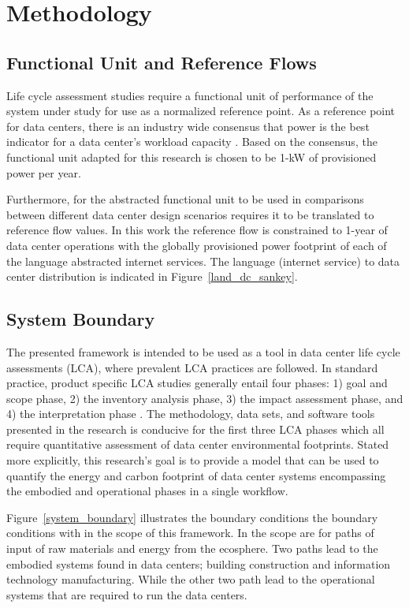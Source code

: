 \section{Methodology}
    \subsection{Functional Unit and Reference Flows}
    Life cycle assessment studies require a functional unit of performance of the system under study for use as a normalized reference point. As a reference point for data centers, there is an industry wide consensus that power is the best indicator for a data center's workload capacity \cite{shah11, whitehead15, barroso18}. Based on the consensus, the functional unit adapted for this research is chosen to be 1-kW of provisioned power per year. 
    
    Furthermore, for the abstracted functional unit to be used in comparisons between different data center design scenarios requires it to be translated to reference flow values. In this work the reference flow is constrained to 1-year of data center operations with the globally provisioned power footprint of each of the language abstracted internet services. The language (internet service) to data center distribution is indicated in Figure~\ref{land_dc_sankey}. 
    
    
    
    \subsection{System Boundary}
    The presented framework is intended to be used as a tool in data center life cycle assessments (LCA), where prevalent LCA practices are followed. In standard practice, product specific LCA studies generally entail four phases: 1) goal and scope phase, 2) the inventory analysis phase, 3) the impact assessment phase, and 4) the interpretation phase \cite{ISO14040}. The methodology, data sets, and software tools presented in the research is conducive for the first three LCA phases which all require quantitative assessment of data center environmental footprints. Stated more explicitly, this research’s goal is to provide a model that can be used to quantify the energy and carbon footprint of data center systems encompassing the embodied and operational phases in a single workflow. 
    
    Figure~\ref{system_boundary} illustrates the boundary conditions the boundary conditions with in the scope of this framework. In the scope are for paths of input of raw materials and energy from the ecosphere. Two paths lead to the embodied systems found in data centers; building construction and information technology manufacturing. While the other two path lead to the operational systems that are required to run the data centers. 
    
